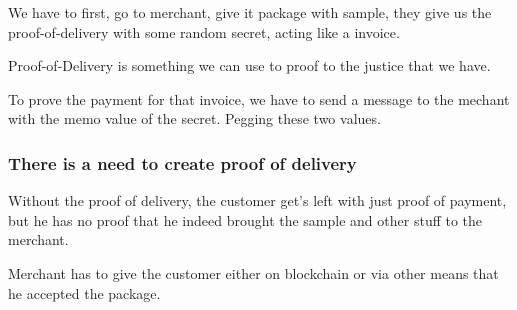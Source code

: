 \documentclass{article}
\begin{document}
We have to first, go to merchant, give it package with sample, they give us the proof-of-delivery with some random secret, acting like a invoice.

Proof-of-Delivery is something we can use to proof to the justice that we have.

To prove the payment for that invoice, we have to send a message to the mechant with the memo value of the secret. Pegging these two values.

\subsubsection{There is a need to create proof of delivery}

Without the proof of delivery, the customer get's left with just proof of payment, but he has no proof that he indeed brought the sample and other stuff to the merchant.

Merchant has to give the customer either on blockchain or via other means that he accepted the package.
\end{document}
